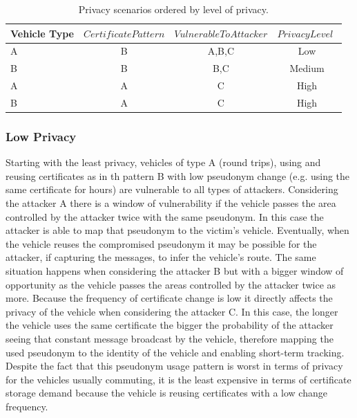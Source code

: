 		\begin{table}
			\renewcommand{\arraystretch}{1.2} %
			\centering
			\begin{tabular}{lccc}
				\toprule
				Vehicle Type           & $CertificatePattern$& $VulnerableToAttacker$ &$PrivacyLevel$ $$\\
				\midrule
				A      & B      & A,B,C & Low\\
				B      & B      & B,C & Medium\\
				A      & A      & C & High\\
				B      & A      & C & High \\
				\bottomrule
				\end{tabular}
				
				\caption{Privacy scenarios ordered by level of privacy.}
				\label{tab:table3}
			\end{table}
			
			\subsubsection{Low Privacy}		
			Starting with the least privacy, vehicles of type A (round trips), using and reusing certificates as in th pattern B with low pseudonym change (e.g. using the same certificate for hours) are vulnerable to all types of attackers. Considering the attacker A there is a window of vulnerability if the vehicle passes the area controlled by the attacker twice with the same pseudonym. In this case the attacker is able to map that pseudonym to the victim's vehicle. Eventually, when the vehicle reuses the compromised pseudonym it may be possible for the attacker, if capturing the messages, to infer the vehicle's route. The same situation happens when considering the attacker B but with a bigger window of opportunity as the vehicle passes the areas controlled by the attacker twice as more. Because the frequency of certificate change is low it directly affects the privacy of the vehicle when considering the attacker C. In this case, the longer the vehicle uses the same certificate the bigger the probability of the attacker seeing that constant message broadcast by the vehicle, therefore mapping the used pseudonym to the identity of the vehicle and enabling short-term tracking. Despite the fact that this pseudonym usage pattern is worst in terms of privacy for the vehicles usually commuting, it is the least expensive in terms of certificate storage demand because the vehicle is reusing certificates with a low change frequency. 
			
